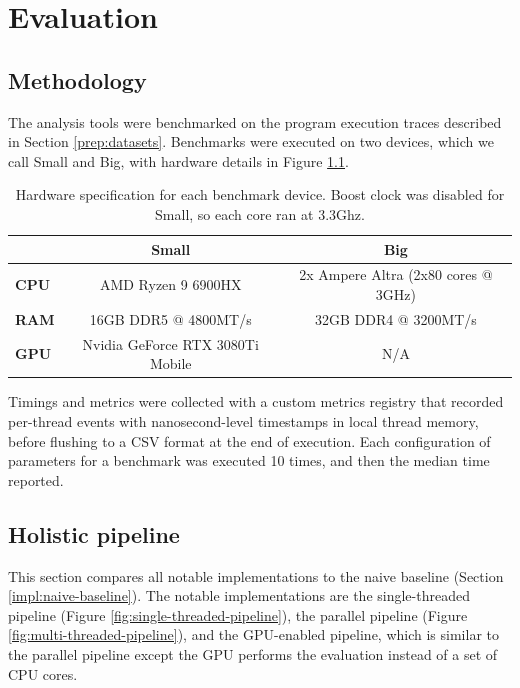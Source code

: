 \chapter{Evaluation}

\section{Methodology}

The analysis tools were benchmarked on the program execution traces described in Section \ref{prep:datasets}.
Benchmarks were executed on two devices, which we call Small and Big, with hardware details in Figure \ref{tbl:specs}.
\begin{table}[ht]
  \centering
\begin{tabular}{l c c}
  \toprule
   & \textbf{Small} & \textbf{Big} \\
  \midrule
  \textbf{CPU} & AMD Ryzen 9 6900HX & 2x Ampere Altra (2x80 cores @ 3GHz) \\
  \textbf{RAM} & 16GB DDR5 @ 4800MT/s & 32GB DDR4 @ 3200MT/s \\
  \textbf{GPU} & Nvidia GeForce RTX 3080Ti Mobile & N/A \\
  \bottomrule
\end{tabular}
\caption{Hardware specification for each benchmark device. Boost clock was disabled for Small, so each core ran at 3.3Ghz.}
\label{tbl:specs}
\end{table}

Timings and metrics were collected with a custom metrics registry that recorded per-thread events with nanosecond-level 
timestamps in local thread memory, before flushing to a CSV format at the end of execution. 
Each configuration of parameters for a benchmark was executed 10 times, and then the median time reported.

\section{Holistic pipeline} \label{eval:holistic-pipeline}

This section compares all notable implementations to the naive baseline (Section \ref{impl:naive-baseline}).
The notable implementations are the single-threaded pipeline (Figure \ref{fig:single-threaded-pipeline}), 
the parallel pipeline (Figure \ref{fig:multi-threaded-pipeline}), and the GPU-enabled 
pipeline, which is similar to the parallel pipeline except the GPU performs the evaluation instead of a set of CPU cores.

